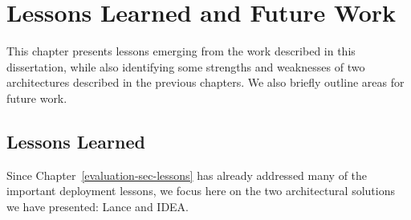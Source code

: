 \chapter{Lessons Learned and Future Work}
\label{chapter-lessons}

This chapter presents lessons emerging from the work described in this
dissertation, while also identifying some strengths and weaknesses of two
architectures described in the previous chapters. We also briefly outline
areas for future work.

\section{Lessons Learned}

Since Chapter~\ref{evaluation-sec-lessons} has already addressed many of the
important deployment lessons, we focus here on the two architectural
solutions we have presented: Lance and IDEA.

